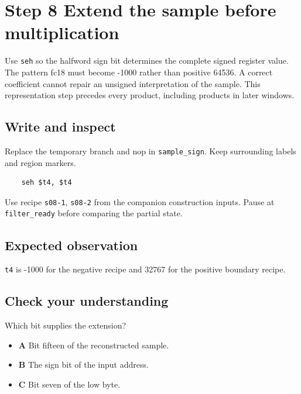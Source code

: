 \section{Step 8 Extend the sample before multiplication}\label{fir-s08}

Use \texttt{seh} so the halfword sign bit determines the complete signed register value. The pattern fc18 must become -1000 rather than positive 64536. A correct coefficient cannot repair an unsigned interpretation of the sample. This representation step precedes every product, including products in later windows.

\subsection{Write and inspect}
Replace the temporary branch and nop in \texttt{sample\_sign}. Keep surrounding labels and region markers.

\begin{verbatim}
    seh $t4, $t4
\end{verbatim}
Use recipe \texttt{s08-1}, \texttt{s08-2} from the companion construction inputs. Pause at \texttt{filter\_ready} before comparing the partial state.

\subsection{Expected observation}
\texttt{t4} is -1000 for the negative recipe and 32767 for the positive boundary recipe.

\subsection{Check your understanding}
Which bit supplies the extension?

\begin{itemize}
  \item \textbf{A} Bit fifteen of the reconstructed sample.
  \item \textbf{B} The sign bit of the input address.
  \item \textbf{C} Bit seven of the low byte.
\end{itemize}
